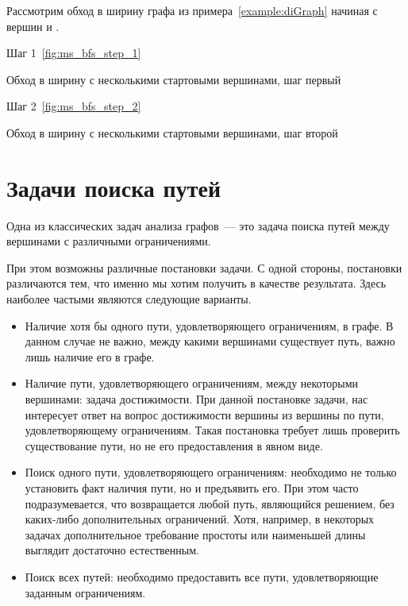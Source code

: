 \begin{example}
    Рассмотрим обход в ширину графа из примера~\ref{example:diGraph} начиная с вершин  и .

    Шаг 1~\ref{fig:ms_bfs_step_1}
    
\begin{marginfigure}
    \begin{center}
        \resizebox{\marginparwidth}{!}{}
    \end{center}
    \caption{Обход в ширину с несколькими стартовыми вершинами, шаг первый}
    \label{fig:ms_bfs_step_1}
\end{marginfigure}

Шаг 2~\ref{fig:ms_bfs_step_2}
\begin{marginfigure}
    \begin{center}
        \resizebox{\marginparwidth}{!}{}
    \end{center}
    \caption{Обход в ширину с несколькими стартовыми вершинами, шаг второй}
    \label{fig:ms_bfs_step_2}
\end{marginfigure}

\end{example}

\section{Задачи поиска путей}

Одна из классических задач анализа графов~--- это задача поиска путей между вершинами с различными ограничениями.

При этом возможны различные постановки задачи.
С одной стороны, постановки различаются тем, что именно мы хотим получить в качестве результата. Здесь наиболее частыми являются следующие варианты.

\begin{itemize}
    \item Наличие хотя бы одного пути, удовлетворяющего ограничениям, в графе.
          В данном случае не важно, между какими вершинами существует путь, важно лишь наличие его в графе.
    \item Наличие пути, удовлетворяющего ограничениям, между некоторыми вершинами: задача достижимости.
          При данной постановке задачи, нас интересует ответ на вопрос достижимости вершины  из вершины  по пути, удовлетворяющему ограничениям.
          Такая постановка требует лишь проверить существование пути, но не его предоставления в явном виде.
    \item Поиск одного пути, удовлетворяющего ограничениям: необходимо не только установить факт наличия пути, но и  предъявить его.
          При этом часто подразумевается, что возвращается любой путь, являющийся решением, без каких-либо дополнительных ограничений.
          Хотя, например, в некоторых задачах дополнительное требование простоты или наименьшей длины выглядит достаточно естественным.
    \item Поиск всех путей: необходимо предоставить все пути, удовлетворяющие заданным ограничениям.
\end{itemize}

